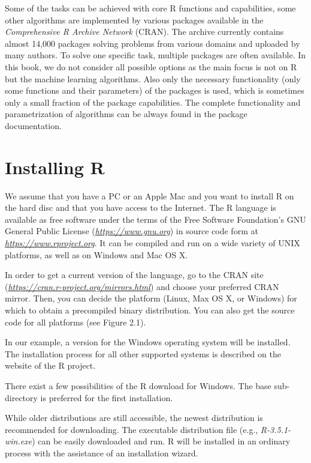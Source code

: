 Some of the tasks can be achieved with core R functions and capabilities,
some other algorithms are implemented by various packages available in the
\textit{Comprehensive R Archive Network} (CRAN). The archive currently contains almost 14,000 packages solving problems from various domains and uploaded by
many authors. To solve one specific task, multiple packages are often available.
In this book, we do not consider all possible options as the main focus is not
on R but the machine learning algorithms. Also only the necessary functionality (only some functions and their parameters) of the packages is used, which is
sometimes only a small fraction of the package capabilities. The complete functionality and parametrization of algorithms can be always found in the package
documentation.

\section{Installing R}
We assume that you have a PC or an Apple Mac and you want to install R on the
hard disc and that you have access to the Internet. The R language is available
as free software under the terms of the Free Software Foundation’s GNU General Public License (\textit{\href{https://www.gnu.org/}{https://www.gnu.org}}) in source code form at \textit{\href{https://www.r-project.org/}{https://www.rproject.org}}. It can be compiled and run on a wide variety of UNIX platforms, as
well as on Windows and Mac OS X.

In order to get a current version of the language, go to the CRAN site
(\textit{\href{https://cran.r-project.org/}{https://cran.r-project.org/mirrors.html}}) and choose your preferred CRAN mirror. Then, you can decide the platform (Linux, Max OS X, or Windows) for
which to obtain a precompiled binary distribution. You can also get the source
code for all platforms (see Figure 2.1).

In our example, a version for the Windows operating system will be installed.
The installation process for all other supported systems is described on the website of the R project.

There exist a few possibilities of the R download for Windows. The base
sub-directory is preferred for the first installation.

While older distributions are still accessible, the newest distribution is recommended for downloading. The executable distribution file (e.g., \textit{R-3.5.1-win.exe})
can be easily downloaded and run. R will be installed in an ordinary process with
the assistance of an installation wizard.

